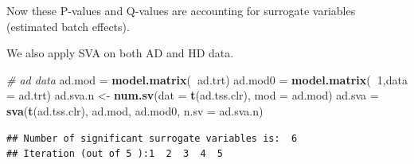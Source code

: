 \documentclass[]{book}
\newenvironment{Shaded}{\begin{snugshade}}{\end{snugshade}}
\newcommand{\KeywordTok}[1]{\textcolor[rgb]{0.13,0.29,0.53}{\textbf{#1}}}
\newcommand{\DataTypeTok}[1]{\textcolor[rgb]{0.13,0.29,0.53}{#1}}
\newcommand{\DecValTok}[1]{\textcolor[rgb]{0.00,0.00,0.81}{#1}}
\newcommand{\StringTok}[1]{\textcolor[rgb]{0.31,0.60,0.02}{#1}}
\newcommand{\CommentTok}[1]{\textcolor[rgb]{0.56,0.35,0.01}{\textit{#1}}}
\newcommand{\OperatorTok}[1]{\textcolor[rgb]{0.81,0.36,0.00}{\textbf{#1}}}
\newcommand{\NormalTok}[1]{#1}
\begin{document}
\begin{Shaded}
\end{Shaded}

Now these P-values and Q-values are accounting for surrogate variables
(estimated batch effects).

We also apply SVA on both AD and HD data.

\begin{Shaded}
\begin{Highlighting}[]
\CommentTok{# ad data}
\NormalTok{ad.mod =}\StringTok{ }\KeywordTok{model.matrix}\NormalTok{(}\OperatorTok{~}\NormalTok{ad.trt)}
\NormalTok{ad.mod0 =}\StringTok{ }\KeywordTok{model.matrix}\NormalTok{(}\OperatorTok{~}\DecValTok{1}\NormalTok{,}\DataTypeTok{data =}\NormalTok{ ad.trt)}
\NormalTok{ad.sva.n <-}\StringTok{ }\KeywordTok{num.sv}\NormalTok{(}\DataTypeTok{dat =} \KeywordTok{t}\NormalTok{(ad.tss.clr), }\DataTypeTok{mod =}\NormalTok{ ad.mod)}
\NormalTok{ad.sva =}\StringTok{ }\KeywordTok{sva}\NormalTok{(}\KeywordTok{t}\NormalTok{(ad.tss.clr), ad.mod, ad.mod0, }\DataTypeTok{n.sv =}\NormalTok{ ad.sva.n)}
\end{Highlighting}
\end{Shaded}

\begin{verbatim}
## Number of significant surrogate variables is:  6 
## Iteration (out of 5 ):1  2  3  4  5
\end{verbatim}
\end{document}
